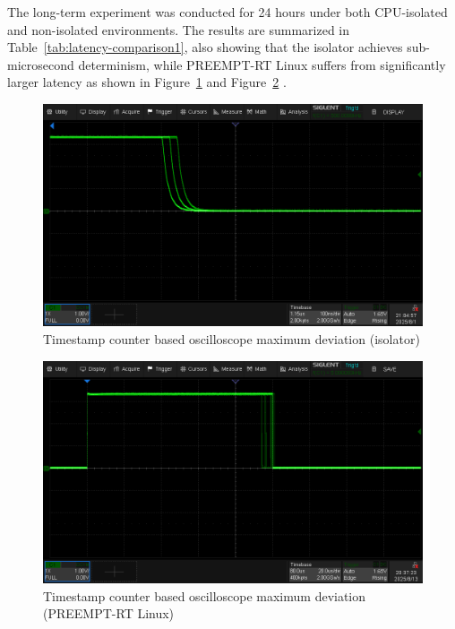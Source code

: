 \documentclass[letterpaper]{article}
\begin{document}
The long-term experiment was conducted for 24 hours under both CPU-isolated and non-isolated environments. The results are summarized in Table~\ref{tab:latency-comparison1}, also showing that the isolator achieves sub-microsecond determinism, while PREEMPT-RT Linux suffers from significantly larger latency
as shown in Figure~\ref{fig:islcountergpio} and Figure~\ref{fig:linuxcountergpio} .

\begin{figure}[h]
  \centering
  \includegraphics[width=0.8\linewidth]{figures/islcountergpio.png}
  \caption{Timestamp counter based oscilloscope maximum deviation (isolator)}
  \label{fig:islcountergpio}
\end{figure}

\begin{figure}[h]
  \centering
  \includegraphics[width=0.8\linewidth]{figures/linuxcountergpio.png}
  \caption{Timestamp counter based oscilloscope maximum deviation (PREEMPT-RT Linux)}
  \label{fig:linuxcountergpio}
\end{figure}



\begin{table}[t]
\centering
{}
\caption{Latency comparison under different configurations.}
\label{tab:latency-comparison}
\end{table}
\end{document}

